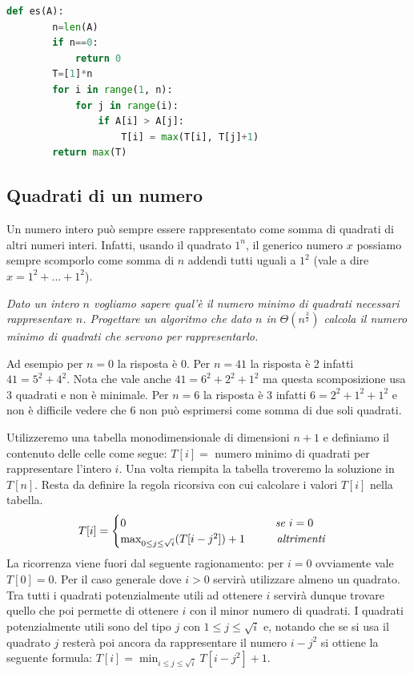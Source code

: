 \begin{lstlisting}[language=Python]
    def es(A):
        n=len(A)
        if n==0:
            return 0
        T=[1]*n
        for i in range(1, n):
            for j in range(i):
                if A[i] > A[j]:
                    T[i] = max(T[i], T[j]+1)
        return max(T)
\end{lstlisting}

\subsection{Quadrati di un numero}
Un numero intero può sempre essere rappresentato come somma di quadrati di altri numeri interi. Infatti, usando il quadrato $1^n$, il generico numero $x$ possiamo sempre scomporlo come somma di $n$ addendi tutti uguali a $1^2$ (vale a dire $x = 1^2 + ... + 1^2$).

\textit{Dato un intero $n$ vogliamo sapere qual'è il numero minimo di quadrati necessari rappresentare $n$. Progettare un algoritmo che dato $n$ in $\Theta(n^{\frac{3}{2}})$ calcola il numero minimo di quadrati che servono per rappresentarlo.}

Ad esempio per $n=0$ la risposta è 0. Per $n=41$ la risposta è 2 infatti $41=5^2+4^2$. Nota che vale anche $41=6^2+2^2+1^2$ ma questa scomposizione usa 3 quadrati e non è minimale. Per $n=6$ la risposta è 3 infatti $6=2^2+1^2+1^2$ e non è difficile vedere che 6 non può esprimersi come somma di due soli quadrati.

Utilizzeremo una tabella monodimensionale di dimensioni $n+1$ e definiamo il contenuto delle celle come segue: $T[i] =$ numero minimo di quadrati per rappresentare l’intero $i$. Una volta riempita la tabella troveremo la soluzione in $T[n]$. Resta da definire la regola ricorsiva con cui calcolare i valori $T[i]$ nella tabella.
\begin{equation*}T[i]=
    \begin{cases}
        0\hspace{4.7cm}\textit{se }i=0\\
        \max_{0\leq j\leq \sqrt{i}}(T[i-j^2])+1\hspace{1cm}\textit{altrimenti}
    \end{cases}
\end{equation*}
La ricorrenza viene fuori dal seguente ragionamento: per $i = 0$ ovviamente vale $T[0] = 0$. Per il caso generale dove $i > 0$ servirà utilizzare almeno un quadrato. Tra tutti i quadrati potenzialmente utili ad ottenere $i$ servirà dunque trovare quello che poi permette di ottenere $i$ con il minor numero di quadrati. I quadrati potenzialmente utili sono del tipo $j$ con $1\leq j \leq \sqrt{i}$ e, notando che se si usa il quadrato $j$ resterà poi ancora da rappresentare il numero $i - j^2$ si ottiene la seguente formula: $T[i] = \min_{i\leq j\leq \sqrt{i}}T[i - j^2] + 1$.

